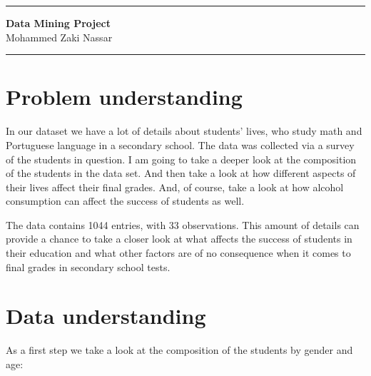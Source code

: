 \documentclass[a4paper, 11pt]{article}
\begin{document}
\begin{center}
\hrule

\vspace{.4cm}
{\bf {\Huge Data Mining Project}}\\
\vspace{.2cm}
{Mohammed Zaki Nassar}  
\end{center}
\hrule

\section{Problem understanding}
	
	In our dataset we have a lot of details about students' lives, who study math and Portuguese language in a secondary school. The data was collected via a survey of the students in question.
	I am going to take a deeper look at the composition of the students in the data set. And then take a look at how different aspects of their lives affect their final grades. And, of course, take a look at how alcohol consumption can affect the success of students as well.
	
	The data contains 1044 entries, with 33 observations. This amount of details can provide a chance to take a closer look at what affects the success of students in their education and what other factors are of no consequence when it comes to final grades in secondary school tests.

\section{Data understanding}
	As a first step we take a look at the composition of the students by gender and age:
	
\end{document}
